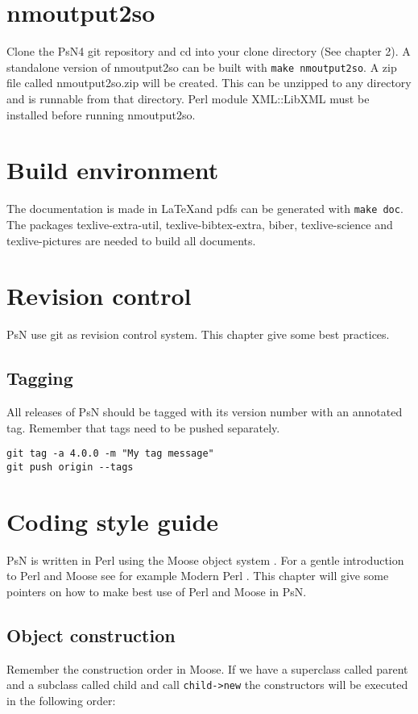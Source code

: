 \section{nmoutput2so}
Clone the PsN4 git repository and cd into your clone directory (See chapter 2). A standalone version of nmoutput2so can be built with \verb|make nmoutput2so|. A zip file called nmoutput2so.zip will be created. This can be unzipped
to any directory and is runnable from that directory.
Perl module XML::LibXML must be installed before running nmoutput2so.

\section{Build environment}
The documentation is made in \LaTeX and pdfs can be generated with \verb|make doc|. The
packages texlive-extra-util, texlive-bibtex-extra, biber, texlive-science and texlive-pictures are needed to build all documents.

\section{Revision control}
PsN use git as revision control system. This chapter give some best practices.

\subsection{Tagging}
All releases of PsN should be tagged with its version number with an annotated tag. Remember
that tags need to be pushed separately.
\begin{verbatim}
git tag -a 4.0.0 -m "My tag message"
git push origin --tags
\end{verbatim}

\section{Coding style guide}
PsN is written in Perl using the Moose object system \cite{Moose}. For a gentle introduction to Perl and Moose see for example Modern Perl \cite{modern}. This chapter will give some pointers on how to make best use of Perl and Moose in PsN. 

\subsection{Object construction}

Remember the construction order in Moose. If we have a superclass called parent and a subclass called child and call \verb|child->new| the constructors will be executed in the following order:

